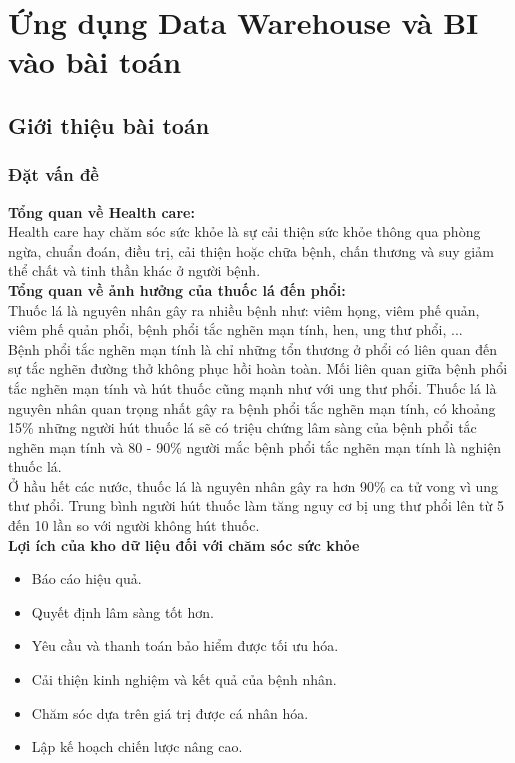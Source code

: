 \section{Ứng dụng Data Warehouse và BI vào bài toán}
\subsection{Giới thiệu bài toán}
\subsubsection{Đặt vấn đề}
\textbf{Tổng quan về Health care: }\\
Health care hay chăm sóc sức khỏe là sự cải thiện sức khỏe thông qua phòng ngừa, chuẩn đoán, điều trị, cải thiện hoặc chữa bệnh, chấn thương và suy giảm thể chất và tinh thần khác ở người bệnh.\\

\textbf{Tổng quan về ảnh hưởng của thuốc lá đến phổi: }\\
Thuốc lá là nguyên nhân gây ra nhiều bệnh như: viêm họng, viêm phế quản, viêm phế quản phổi, bệnh phổi tắc nghẽn mạn tính, hen, ung thư phổi, ...\\
Bệnh phổi tắc nghẽn mạn tính là chỉ những tổn thương ở phổi có liên quan đến sự tắc nghẽn đường thở không phục hồi hoàn toàn. Mối liên quan giữa bệnh phổi tắc nghẽn mạn tính và hút thuốc cũng mạnh như với ung thư phổi.
Thuốc lá là nguyên nhân quan trọng nhất gây ra bệnh phổi tắc nghẽn mạn tính, có khoảng 15\% những người hút thuốc lá sẽ có triệu chứng lâm sàng của bệnh phổi tắc nghẽn mạn tính và 80 - 90\% người mắc bệnh phổi tắc nghẽn mạn tính là nghiện thuốc lá.\\
Ở hầu hết các nước, thuốc lá là nguyên nhân gây ra hơn 90\% ca tử vong vì ung thư phổi. Trung bình người hút thuốc làm tăng nguy cơ bị ung thư phổi lên từ 5 đến 10 lần so với người không hút thuốc.\\

\textbf{Lợi ích của kho dữ liệu đối với chăm sóc sức khỏe}
\begin{itemize}[label=$-$]
\item Báo cáo hiệu quả.
\item Quyết định lâm sàng tốt hơn.
\item Yêu cầu và thanh toán bảo hiểm được tối ưu hóa.
\item Cải thiện kinh nghiệm và kết quả của bệnh nhân.
\item Chăm sóc dựa trên giá trị được cá nhân hóa.
\item Lập kế hoạch chiến lược nâng cao.
\end{itemize}
\newpage
